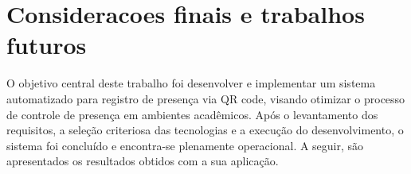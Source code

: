 \section{Consideracoes finais e trabalhos futuros}
\label{sec:consideracoes_finais_trabalhos_futuros}


O objetivo central deste trabalho foi desenvolver e implementar um sistema automatizado para registro de presença via QR code, visando otimizar o processo de controle de presença em ambientes acadêmicos. Após o levantamento dos requisitos, a seleção criteriosa das tecnologias e a execução do desenvolvimento, o sistema foi concluído e encontra-se plenamente operacional. A seguir, são apresentados os resultados obtidos com a sua aplicação.
